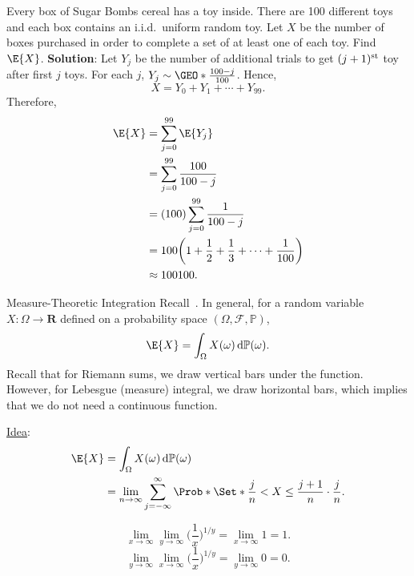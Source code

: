 \begin{Example}{}{}
    Every box of Sugar Bombs cereal has a toy inside. There are 100 different
    toys and each box contains an i.i.d.\ uniform random toy.
    Let $ X $ be the number of boxes purchased in order to complete
    a set of at least one of each toy. Find $ \E{X} $.
    \tcblower{}
    \textbf{Solution}: Let $ Y_j $ be the number of additional trials
    to get $ (j+1)\textsuperscript{st} $ toy after first $ j $ toys.
    For each $ j $, $ Y_j \sim \GEO*{\frac{100-j}{100}} $. Hence,
    \[ X=Y_0+Y_1+\cdots+Y_{99}. \]
    Therefore,
    \begin{align*}
        \E{X}
         & =\sum_{j=0}^{99}\E{Y_j}                                          \\
         & =\sum_{j=0}^{99}\frac{100}{100-j}                                \\
         & =(100)\sum_{j=0}^{99}\frac{1}{100-j}                             \\
         & =100\biggl(1+\frac{1}{2}+\frac{1}{3}+\cdots+\frac{1}{100}\biggr) \\
         & \approx 100\ln{100}.
    \end{align*}
\end{Example}
\begin{Remark}{Measure-Theoretic Integration}{}
    Recall~. In general, for a random
    variable $ X\colon \Omega\to\mathbf{R} $ defined on a probability
    space $ (\Omega,\mathcal{F},\mathbb{P}) $,
    \[ \E{X}=\int_{\Omega}X(\omega)\odif{\mathbb{P}(\omega)}. \]
    Recall that for Riemann sums, we draw vertical bars under the function.
    However, for Lebesgue (measure) integral, we draw horizontal bars, which
    implies that we do not need a continuous function.

    \underline{Idea}:
    \begin{align*}
        \E{X}
         & =\int_{\Omega}X(\omega)\odif{\mathbb{P}(\omega)}         \\
         & =\lim\limits_{{n} \to {\infty}}\sum_{j=-\infty}^{\infty}
        \Prob*{\Set*{\frac{j}{n}<X\le \frac{j+1}{n}}}\cdot \frac{j}{n}.
    \end{align*}
\end{Remark}
\begin{Remark}{}{}
    \[ \lim\limits_{{x} \to {\infty}}\lim\limits_{{y} \to {\infty}}
        \biggl(\frac{1}{x}\biggr)^{1/y}=\lim\limits_{{x} \to {\infty}}1=1. \]
    \[ \lim\limits_{{y} \to {\infty}}\lim\limits_{{x} \to {\infty}}
        \biggl(\frac{1}{x}\biggr)^{1/y}=\lim\limits_{{y} \to {\infty}}0=0. \]
\end{Remark}
